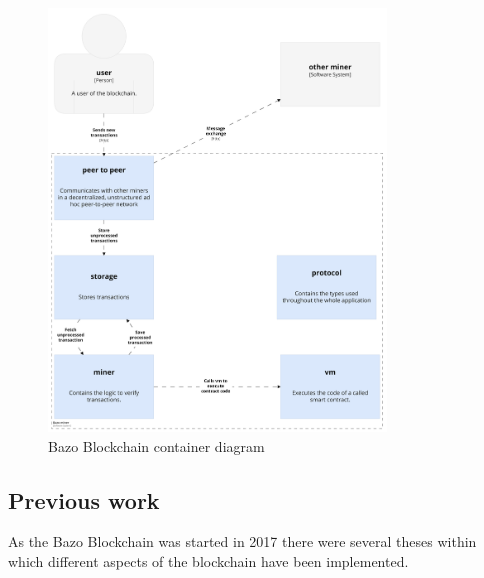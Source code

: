 \begin{figure}[H]
	\begin{center}
	\includegraphics[width=0.8\textwidth]{./images/BAZO_Container}
	\caption{Bazo Blockchain container diagram}
	\label{systemcontainerdiagram}
	\end{center}
\end{figure}
\pagebreak

\subsection{Previous work}
As the Bazo Blockchain was started in 2017 there were several theses within which different aspects of the blockchain have been implemented. 

